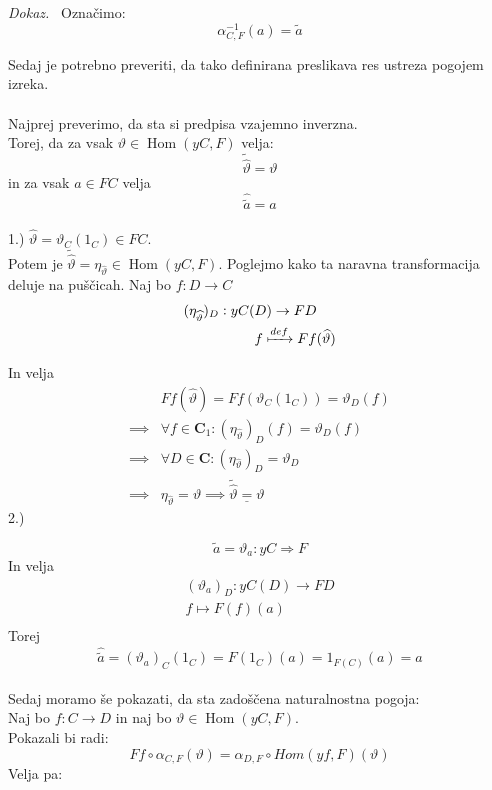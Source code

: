 \documentclass[12pt,a4paper]{book}
\theoremstyle{definition}
\theoremstyle{plain}
\newenvironment{dokaz}{\emph{Dokaz.}\ }{\hspace{\fill}{$\Box$}}
\theoremstyle{definition}
\theoremstyle{remark}
\DeclareMathOperator{\Hom}{Hom}
\begin{document}
\begin{dokaz}
Označimo:
\begin{equation}
\boxed{\alpha^{-1}_{C,F}(a) = \widetilde{a}}
\end{equation}

Sedaj je potrebno preveriti, da tako definirana preslikava res ustreza pogojem izreka. \\
\\
Najprej preverimo, da sta si predpisa vzajemno inverzna. \\
Torej, da za vsak $\vartheta \in \Hom(yC,F)$ velja: 
$$\widetilde{\widehat{\vartheta}} = \vartheta$$
in za vsak $a \in FC$ velja
$$\widehat{\widetilde{a}} = a$$
\\ 1.)
$\widehat{\vartheta} = \vartheta_C(1_C) \in FC$. \\
Potem je $\widetilde{\widehat{\vartheta}} = \eta_{\widehat{\vartheta}} \in \Hom(yC,F)$. Poglejmo kako ta naravna transformacija deluje na puščicah. Naj bo $f : D \to C$
\begin{align*}
(\eta_{\widehat{\vartheta}})_D : yC(&D) \to FD \\
&f \xmapsto{def} Ff(\widehat{\vartheta}) \\
\end{align*}

In velja
\begin{align*}
&Ff(\widehat{\vartheta}) = Ff(\vartheta_C(1_C)) = \vartheta_D(f) \\
\implies& \forall f \in \textbf{C}_1  : (\eta_{\widehat{\vartheta}})_D(f) = \vartheta_D(f) \\
\implies& \forall D \in \textbf{C} : (\eta_{\widehat{\vartheta}})_D = \vartheta_D \\
\implies& \eta_{\widehat{\vartheta}} = \vartheta
\implies \underline{\widetilde{\widehat{\vartheta}} = \vartheta}
\end{align*}
2.) 

$$\widetilde{a} = \vartheta_a : yC \Rightarrow F$$
In velja
\begin{align*}
(\vartheta_a)_D : yC(D) \to FD \\
f \mapsto F(f)(a) \\
\end{align*}
Torej
$$\widehat{\widetilde{a}} = (\vartheta_a)_C(1_C) = F(1_C)(a) = 1_{F(C)}(a) = a$$
\\
Sedaj moramo še pokazati, da sta zadoščena naturalnostna pogoja: \\
Naj bo $f : C \to D$ in naj bo $\vartheta \in \Hom(yC,F)$. \\
Pokazali bi radi:
\begin{equation}
Ff \circ \alpha_{C,F}(\vartheta) = \alpha_{D,F} \circ Hom(yf,F)(\vartheta)
\end{equation}
Velja pa:


\end{dokaz}
\end{document}
